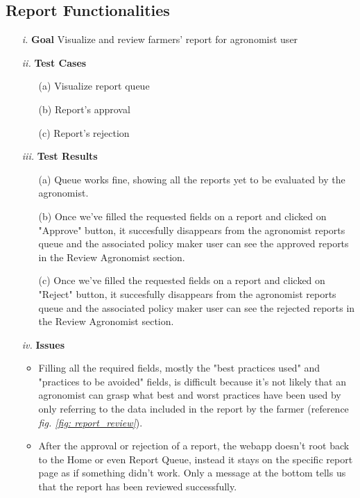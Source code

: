 \documentclass[table, 12pt]{article}
\begin{document}
\subsection{Report Functionalities}
\begin{itemize}
    \item[\textit{i.}] \textbf{Goal} Visualize and review farmers' report for agronomist user
    \item[\textit{ii.}] \textbf{Test Cases}
    \begin{itemize}
        \item[(a)] Visualize report queue
        \item[(b)] Report's approval
        \item[(c)] Report's rejection 
    \end{itemize} 
    \item[\textit{iii.}] \textbf{Test Results}
    \begin{itemize}
        \item[(a)] Queue works fine, showing all the reports yet to be evaluated by the agronomist.
        \item[(b)] Once we've filled the requested fields on a report and clicked on "Approve" button, it succesfully disappears from the agronomist reports queue and the associated policy maker user can see the approved reports in the Review Agronomist section.
        \item[(c)] Once we've filled the requested fields on a report and clicked on "Reject" button, it succesfully disappears from the agronomist reports queue and the associated policy maker user can see the rejected reports in the Review Agronomist section.
    \end{itemize} 
    \item[\textit{iv.}] \textbf{Issues} 
    \begin{itemize}
        \item Filling all the required fields, mostly the "best practices used" and "practices to be avoided" fields, is difficult because it's not likely that an agronomist can grasp what best and worst practices have been used by only referring to the data included in the report by the farmer (reference \emph{fig. \ref{fig: report_review}}).
        \item After the approval or rejection of a report, the webapp doesn't root back to the Home or even Report Queue, instead it stays on the specific report page as if something didn't work. Only a message at the bottom tells us that the report has been reviewed successfully. 
    \end{itemize}   
\end{itemize}
\end{document}
